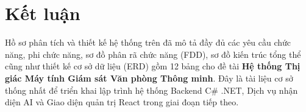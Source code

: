 \documentclass[12pt,a4paper]{article}
\begin{document}
\section{Kết luận}
Hồ sơ phân tích và thiết kế hệ thống trên đã mô tả đầy đủ các yêu cầu chức năng, phi chức năng, sơ đồ phân rã chức năng (FDD), sơ đồ kiến trúc tổng thể cũng như thiết kế cơ sở dữ liệu (ERD) gồm 12 bảng cho đề tài \textbf{Hệ thống Thị giác Máy tính Giám sát Văn phòng Thông minh}. Đây là tài liệu cơ sở thống nhất để triển khai lập trình hệ thống Backend C\# .NET, Dịch vụ nhận diện AI và Giao diện quản trị React trong giai đoạn tiếp theo.
\end{document}
